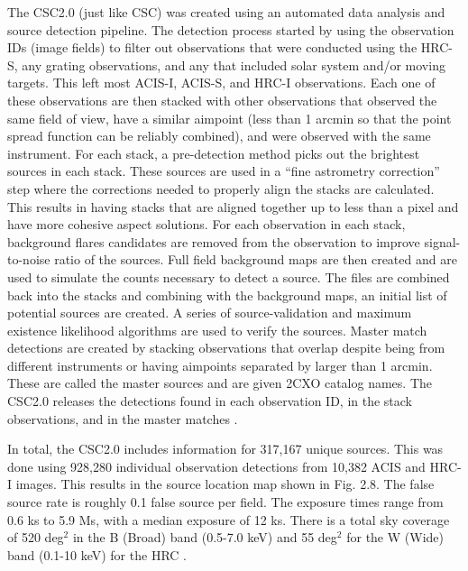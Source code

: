 The CSC2.0 (just like CSC) was created using an automated data analysis and source detection pipeline.
The detection process started by using the observation IDs (image fields) to filter out observations that were conducted using the HRC-S, any grating observations, and any that included solar system and/or moving targets. 
This left most ACIS-I, ACIS-S, and HRC-I observations. 
Each one of these observations are then stacked with other observations that observed the same field of view, have a similar aimpoint (less than 1 arcmin so that the point spread function can be reliably combined), and were observed with the same instrument. 
For each stack, a pre-detection method picks out the brightest sources in each stack.
These sources are used in a “fine astrometry correction” step where the corrections needed to properly align the stacks are calculated. 
This results in having stacks that are aligned together up to less than a pixel and have more cohesive aspect solutions. 
For each observation in each stack, background flares candidates are removed from the observation to improve signal-to-noise ratio of the sources.
Full field background maps are then created and are used to simulate the counts necessary to detect a source.
The files are combined back into the stacks and combining with the background maps, an initial list of potential sources are created. 
A series of source-validation and maximum existence likelihood algorithms are used to verify the sources. 
Master match detections are created by stacking observations that overlap despite being from different instruments or having aimpoints separated by larger than 1 arcmin.
These are called the master sources and are given 2CXO catalog names. 
The CSC2.0 releases the detections found in each observation ID, in the stack observations, and in the master matches \citep{Evans2020}.

In total, the CSC2.0 includes information for 317,167 unique sources.
This was done using 928,280 individual observation detections from 10,382 ACIS and HRC-I images. 
This results in the source location map shown in Fig. 2.8. 
The false source rate is roughly 0.1 false source per field. 
The exposure times range from 0.6 ks to 5.9 Ms, with a median exposure of 12 ks.
There is a total sky coverage of 520 deg$^2$ in the B (Broad) band (0.5-7.0 keV) and 55 deg$^2$ for the W (Wide) band (0.1-10 keV) for the HRC \citep{Evans2020}.



